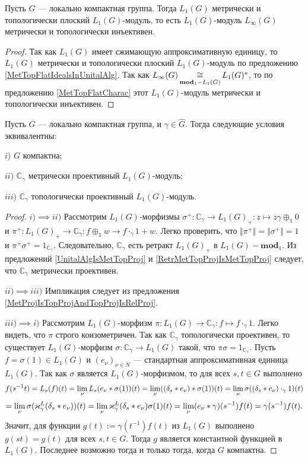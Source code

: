 \begin{proposition}\label{LInfIsL1MetrInj} Пусть $G$ --- локально компактная группа. Тогда $L_1(G)$ метрически и топологически плоский $L_1(G)$-модуль, то есть $L_1(G)$-модуль $L_\infty(G)$ метрически и топологически инъективен.
\end{proposition} 
\begin{proof} Так как $L_1(G)$ имеет сжимающую аппроксимативную единицу, то $L_1(G)$ метрически и топологически плоский $L_1(G)$-модуль по предложению \ref{MetTopFlatIdealsInUnitalAlg}. Так как $L_\infty(G)\mathop{\mathbin{\cong}}\limits_{\mathbf{mod}_1-L_1(G)}L_1(G)^*$, то по предложению \ref{MetTopFlatCharac} этот $L_1(G)$-модуль метрически и топологически инъективен.
\end{proof}

\begin{proposition}\label{OneDimL1ModMetTopProjCharac} Пусть $G$ --- локально компактная группа, и $\gamma\in\widehat{G}$. Тогда следующие условия эквивалентны: 

$i)$ $G$ компактна;

$ii)$ $\mathbb{C}_\gamma$ метрически проективный $L_1(G)$-модуль;

$iii)$ $\mathbb{C}_\gamma$ топологически проективный $L_1(G)$-модуль.
\end{proposition}
\begin{proof} $i)$$\implies$$ ii)$ Рассмотрим $L_1(G)$-морфизмы $\sigma^+:\mathbb{C}_\gamma\to L_1(G)_+:z\mapsto z\gamma \oplus_1 0$ и $\pi^+:L_1(G)_+\to\mathbb{C}_\gamma: f\oplus_1 w\to f\cdot_{\gamma}1+w$. Легко проверить, что $\Vert\pi^+\Vert=\Vert\sigma^+\Vert=1$ и $\pi^+\sigma^+=1_{\mathbb{C}_\gamma}$. Следовательно, $\mathbb{C}_\gamma$ есть ретракт $L_1(G)_+$ в $L_1(G)-\mathbf{mod}_1$. Из предложений \ref{UnitalAlgIsMetTopProj} и \ref{RetrMetTopProjIsMetTopProj} следует, что $\mathbb{C}_\gamma$ метрически проективен.

$ii)$$\implies$$ iii)$ Импликация следует из предложения \ref{MetProjIsTopProjAndTopProjIsRelProj}.

$iii)$$\implies$$i)$ Рассмотрим $L_1(G)$-морфизм $\pi:L_1(G)\to\mathbb{C}_\gamma:f\mapsto f\cdot_{\gamma} 1$. Легко видеть, что $\pi$ строго коизометричен. Так как $\mathbb{C}_\gamma$ топологически проективен, то существует $L_1(G)$-морфизм $\sigma:\mathbb{C}_\gamma\to L_1(G)$ такой, что $\pi\sigma=1_{\mathbb{C}_\gamma}$. Пусть $f=\sigma(1)\in L_1(G)$ и $(e_\nu)_{\nu\in N}$ --- стандартная аппроксимативная единица $L_1(G)$. Так как $\sigma$ является $L_1(G)$-морфизмом, то для всех $s,t\in G$ выполнено 
$$
f(s^{-1}t)
=L_s(f)(t)
=\lim_\nu L_s(e_\nu\ast \sigma(1))(t)
=\lim_\nu((\delta_s\ast e_\nu)\ast \sigma(1))(t)
=\lim_\nu\sigma((\delta_s\ast e_\nu)\cdot_{\gamma} 1)(t)
$$
$$
=\lim_\nu\sigma(\varkappa_\gamma^L(\delta_s\ast e_\nu))(t)
=\lim_\nu\varkappa_\gamma^L(\delta_s\ast e_\nu)\sigma(1)(t)
=\lim_\nu(e_\nu\ast\gamma)(s^{-1})f(t)
=\gamma(s^{-1})f(t).
$$
Значит, для функции $g(t):=\gamma(t^{-1})f(t)$ из $L_1(G)$ выполнено $g(st)=g(t)$ для всех $s,t\in G$. Тогда $g$ является константной функцией в $L_1(G)$. Последнее возможно тогда и только тогда, когда $G$ компактна.
\end{proof}

